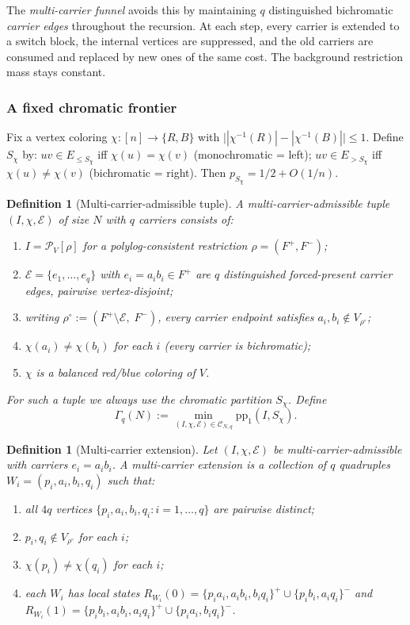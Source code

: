 \documentclass[11pt]{article}
\newtheorem{definition}[theorem]{Definition}
\begin{document}
The \emph{multi-carrier funnel} avoids this by maintaining $q$ distinguished
bichromatic \emph{carrier edges} throughout the recursion.  At each step,
every carrier is extended to a switch block, the internal vertices are
suppressed, and the old carriers are consumed and replaced by new ones of
the same cost.  The background restriction mass stays constant.

\subsubsection*{A fixed chromatic frontier}

Fix a vertex coloring $\chi : [n] \to \{R, B\}$ with
$\bigl||\chi^{-1}(R)| - |\chi^{-1}(B)|\bigr| \le 1$.
Define $S_\chi$ by: $uv \in E_{\le S_\chi}$ iff $\chi(u) = \chi(v)$
(monochromatic = left); $uv \in E_{> S_\chi}$ iff $\chi(u) \neq \chi(v)$
(bichromatic = right).  Then $p_{S_\chi} = 1/2 + O(1/n)$.

\begin{definition}[Multi-carrier-admissible tuple]
\label{def:multi-carrier-admissible}
A \emph{multi-carrier-admissible tuple} $(I, \chi, \mathcal{E})$ of size $N$
with $q$ carriers consists of:
\begin{enumerate}
\item $I = \mathcal{P}_V[\rho]$ for a polylog-consistent restriction
  $\rho = (F^+, F^-)$;
\item $\mathcal{E} = \{e_1, \ldots, e_q\}$ with $e_i = a_ib_i \in F^+$
  are $q$ distinguished forced-present carrier edges, pairwise
  vertex-disjoint;
\item writing $\rho^\circ := (F^+ \setminus \mathcal{E},\; F^-)$,
  every carrier endpoint satisfies $a_i, b_i \notin V_{\rho^\circ}$;
\item $\chi(a_i) \neq \chi(b_i)$ for each $i$ (every carrier is
  bichromatic);
\item $\chi$ is a balanced red/blue coloring of $V$.
\end{enumerate}
For such a tuple we always use the chromatic partition $S_\chi$.
Define
\[
\Gamma_q(N) := \min_{(I,\chi,\mathcal{E}) \in \mathcal{C}_{N,q}}
  \mathrm{pp}_1(I, S_\chi).
\]
\end{definition}

\begin{definition}[Multi-carrier extension]
\label{def:multi-carrier-extension}
Let $(I, \chi, \mathcal{E})$ be multi-carrier-admissible with carriers
$e_i = a_ib_i$.  A \emph{multi-carrier extension} is a collection of $q$
quadruples $W_i = (p_i, a_i, b_i, q_i)$ such that:
\begin{enumerate}
\item all $4q$ vertices $\{p_i, a_i, b_i, q_i : i = 1, \ldots, q\}$ are
  pairwise distinct;
\item $p_i, q_i \notin V_{\rho^\circ}$ for each $i$;
\item $\chi(p_i) \neq \chi(q_i)$ for each $i$;
\item each $W_i$ has local states $R_{W_i}(0) = \{p_ia_i, a_ib_i,
  b_iq_i\}^+ \cup \{p_ib_i, a_iq_i\}^-$ and
  $R_{W_i}(1) = \{p_ib_i, a_ib_i, a_iq_i\}^+ \cup \{p_ia_i, b_iq_i\}^-$.
\end{enumerate}
\end{definition}
\end{document}
